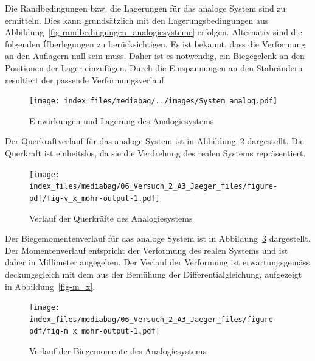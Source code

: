 \documentclass[
  12pt,
  letterpaper,
  egregdoesnotlikesansseriftitles]{scrreprt}
\begin{document}
Die Randbedingungen bzw. die Lagerungen für das analoge System sind zu
ermitteln. Dies kann grundsätzlich mit den Lagerungsbedingungen aus
Abbildung~\ref{fig-randbedingungen_analogiesysteme} erfolgen. Alternativ
sind die folgenden Überlegungen zu berücksichtigen. Es ist bekannt, dass
die Verformung an den Auflagern null sein muss. Daher ist es notwendig,
ein Biegegelenk an den Positionen der Lager einzufügen. Durch die
Einspannungen an den Stabrändern resultiert der passende
Verformungsverlauf.

\begin{figure}[H]

{\centering \texttt{[image: index\_files/mediabag/../images/System\_analog.pdf]}

}

\caption{\label{fig-system_analog}Einwirkungen und Lagerung des
Analogiesystems}

\end{figure}

Der Querkraftverlauf für das analoge System ist in
Abbildung~\ref{fig-v_x_mohr} dargestellt. Die Querkraft ist einheitslos,
da sie die Verdrehung des realen Systems repräsentiert.

\begin{figure}[H]

{\centering \texttt{[image: index\_files/mediabag/06\_Versuch\_2\_A3\_Jaeger\_files/figure-pdf/fig-v\_x\_mohr-output-1.pdf]}

}

\caption{\label{fig-v_x_mohr}Verlauf der Querkräfte des Analogiesystems}

\end{figure}

Der Biegemomentenverlauf für das analoge System ist in
Abbildung~\ref{fig-m_x_mohr} dargestellt. Der Momentenverlauf entspricht
der Verformung des realen Systems und ist daher in Millimeter angegeben.
Der Verlauf der Verformung ist erwartungsgemäss deckungsgleich mit dem
aus der Bemühung der Differentialgleichung, aufgezeigt in
Abbildung~\ref{fig-m_x}.

\begin{figure}[H]

{\centering \texttt{[image: index\_files/mediabag/06\_Versuch\_2\_A3\_Jaeger\_files/figure-pdf/fig-m\_x\_mohr-output-1.pdf]}

}

\caption{\label{fig-m_x_mohr}Verlauf der Biegemomente des
Analogiesystems}

\end{figure}
\end{document}
